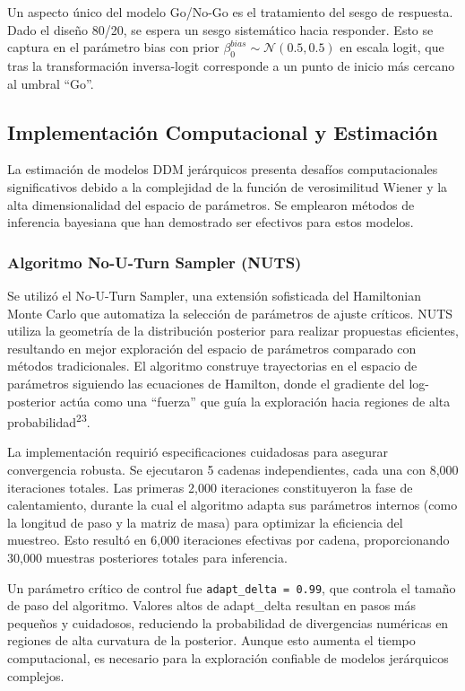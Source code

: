 \documentclass[
  spanish,
  10pt,
]{article}
\begin{document}
Un aspecto único del modelo Go/No-Go es el tratamiento del sesgo de
respuesta. Dado el diseño 80/20, se espera un sesgo sistemático hacia
responder. Esto se captura en el parámetro bias con prior
\(\beta_0^{bias} \sim \mathcal{N}(0.5, 0.5)\) en escala logit, que tras
la transformación inversa-logit corresponde a un punto de inicio más
cercano al umbral ``Go''.

\subsection{Implementación Computacional y
Estimación}\label{implementaciuxf3n-computacional-y-estimaciuxf3n}

La estimación de modelos DDM jerárquicos presenta desafíos
computacionales significativos debido a la complejidad de la función de
verosimilitud Wiener y la alta dimensionalidad del espacio de
parámetros. Se emplearon métodos de inferencia bayesiana que han
demostrado ser efectivos para estos modelos.

\subsubsection{Algoritmo No-U-Turn Sampler
(NUTS)}\label{algoritmo-no-u-turn-sampler-nuts}

Se utilizó el No-U-Turn Sampler, una extensión sofisticada del
Hamiltonian Monte Carlo que automatiza la selección de parámetros de
ajuste críticos. NUTS utiliza la geometría de la distribución posterior
para realizar propuestas eficientes, resultando en mejor exploración del
espacio de parámetros comparado con métodos tradicionales. El algoritmo
construye trayectorias en el espacio de parámetros siguiendo las
ecuaciones de Hamilton, donde el gradiente del log-posterior actúa como
una ``fuerza'' que guía la exploración hacia regiones de alta
probabilidad\textsuperscript{23}.

La implementación requirió especificaciones cuidadosas para asegurar
convergencia robusta. Se ejecutaron 5 cadenas independientes, cada una
con 8,000 iteraciones totales. Las primeras 2,000 iteraciones
constituyeron la fase de calentamiento, durante la cual el algoritmo
adapta sus parámetros internos (como la longitud de paso y la matriz de
masa) para optimizar la eficiencia del muestreo. Esto resultó en 6,000
iteraciones efectivas por cadena, proporcionando 30,000 muestras
posteriores totales para inferencia.

Un parámetro crítico de control fue \texttt{adapt\_delta\ =\ 0.99}, que
controla el tamaño de paso del algoritmo. Valores altos de adapt\_delta
resultan en pasos más pequeños y cuidadosos, reduciendo la probabilidad
de divergencias numéricas en regiones de alta curvatura de la posterior.
Aunque esto aumenta el tiempo computacional, es necesario para la
exploración confiable de modelos jerárquicos complejos.
\end{document}
